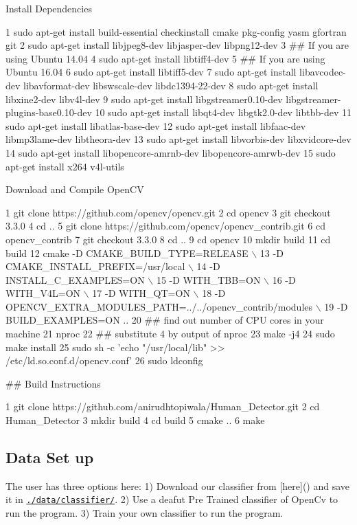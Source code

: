 Install Dependencies 
\begin{DoxyCode}
1 sudo apt-get install build-essential checkinstall cmake pkg-config yasm gfortran git
2 sudo apt-get install libjpeg8-dev libjasper-dev libpng12-dev
3 ## If you are using Ubuntu 14.04
4 sudo apt-get install libtiff4-dev
5 ## If you are using Ubuntu 16.04
6 sudo apt-get install libtiff5-dev
7 sudo apt-get install libavcodec-dev libavformat-dev libswscale-dev libdc1394-22-dev
8 sudo apt-get install libxine2-dev libv4l-dev
9 sudo apt-get install libgstreamer0.10-dev libgstreamer-plugins-base0.10-dev
10 sudo apt-get install libqt4-dev libgtk2.0-dev libtbb-dev
11 sudo apt-get install libatlas-base-dev
12 sudo apt-get install libfaac-dev libmp3lame-dev libtheora-dev
13 sudo apt-get install libvorbis-dev libxvidcore-dev
14 sudo apt-get install libopencore-amrnb-dev libopencore-amrwb-dev
15 sudo apt-get install x264 v4l-utils
\end{DoxyCode}
 Download and Compile Open\+CV 
\begin{DoxyCode}
1 git clone https://github.com/opencv/opencv.git
2 cd opencv 
3 git checkout 3.3.0 
4 cd ..
5 git clone https://github.com/opencv/opencv\_contrib.git
6 cd opencv\_contrib
7 git checkout 3.3.0
8 cd ..
9 cd opencv
10 mkdir build
11 cd build
12 cmake -D CMAKE\_BUILD\_TYPE=RELEASE \(\backslash\)
13       -D CMAKE\_INSTALL\_PREFIX=/usr/local \(\backslash\)
14       -D INSTALL\_C\_EXAMPLES=ON \(\backslash\)
15       -D WITH\_TBB=ON \(\backslash\)
16       -D WITH\_V4L=ON \(\backslash\)
17       -D WITH\_QT=ON \(\backslash\)
18       -D OPENCV\_EXTRA\_MODULES\_PATH=../../opencv\_contrib/modules \(\backslash\)
19       -D BUILD\_EXAMPLES=ON ..
20 ## find out number of CPU cores in your machine
21 nproc
22 ## substitute 4 by output of nproc
23 make -j4
24 sudo make install
25 sudo sh -c 'echo "/usr/local/lib" >> /etc/ld.so.conf.d/opencv.conf'
26 sudo ldconfig
\end{DoxyCode}


\#\# Build Instructions 
\begin{DoxyCode}
1 git clone https://github.com/anirudhtopiwala/Human\_Detector.git
2 cd Human\_Detector
3 mkdir build
4 cd build
5 cmake ..
6 make
\end{DoxyCode}
 \subsection*{Data Set up}

The user has three options here\+: 1) Download our classifier from \mbox{[}here\mbox{]}() and save it in \href{https://github.com/anirudhtopiwala/Human_Detector/tree/master/data/classifier/}{\tt ./data/classifier/}. 2) Use a deafut Pre Trained classifier of Open\+Cv to run the program. 3) Train your own classifier to run the program.


